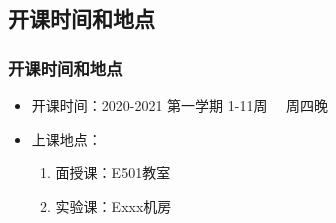 \documentclass[11pt]{beamer}
\begin{document}
\subsection{开课时间和地点}
\begin{frame}
	\frametitle{开课时间和地点}
	\begin{itemize}
		\item 开课时间：2020-2021 第一学期 1-11周 \ \ 周四晚
		\item 上课地点：
		      \begin{enumerate}
			      \item 面授课：E501教室
			      \item 实验课：Exxx机房
		      \end{enumerate}
	\end{itemize}
\end{frame}
\end{document}
